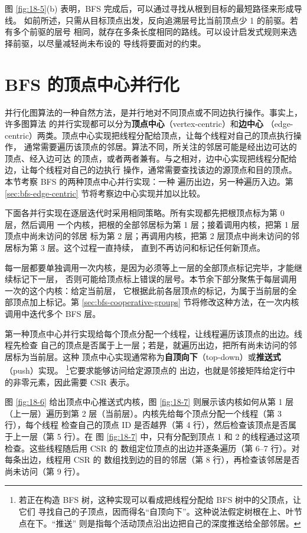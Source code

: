 图 \ref{fig:18-5}(b) 表明，BFS 完成后，可以通过寻找从根到目标的最短路径来形成导线。
如前所述，只需从目标顶点出发，反向追溯层号比当前顶点少 1 的前驱。若有多个前驱的层号
相同，就存在多条长度相同的路线。可以设计启发式规则来选择前驱，以尽量减轻尚未布设的
导线将要面对的约束。

\section{BFS 的顶点中心并行化}
\label{sec:bfs-vertex-centric}

并行化图算法的一种自然方法，是并行地对不同顶点或不同边执行操作。事实上，许多图算法
的并行实现都可以分为\textbf{顶点中心}（vertex-centric）和\textbf{边中心}
（edge-centric）两类。顶点中心实现把线程分配给顶点，让每个线程对自己的顶点执行操作，
通常需要遍历该顶点的邻居。算法不同，所关注的邻居可能是经出边可达的顶点、经入边可达
的顶点，或者两者兼有。与之相对，边中心实现把线程分配给边，让每个线程对自己的边执行
操作，通常需要查找该边的源顶点和目的顶点。本节考察 BFS 的两种顶点中心并行实现：一种
遍历出边，另一种遍历入边。第 \ref{sec:bfs-edge-centric} 节将考察边中心实现并加以比较。

下面各并行实现在逐层迭代时采用相同策略。所有实现都先把根顶点标为第 0 层，然后调用
一个内核，把根的全部邻居标为第 1 层；接着调用内核，把第 1 层顶点中尚未访问的邻居
标为第 2 层；再调用内核，把第 2 层顶点中尚未访问的邻居标为第 3 层。这个过程一直持续，
直到不再访问和标记任何新顶点。

每一层都要单独调用一次内核，是因为必须等上一层的全部顶点标记完毕，才能继续标记下一层，
否则可能给顶点标上错误的层号。本节余下部分聚焦于每层调用一次的这个内核：给定当前层，
它根据此前各层顶点的标记，为属于当前层的全部顶点加上标记。第
\ref{sec:bfs-cooperative-groups} 节将修改这种方法，在一次内核调用中迭代多个 BFS 层。

第一种顶点中心并行实现给每个顶点分配一个线程，让线程遍历该顶点的出边。线程先检查
自己的顶点是否属于上一层；若是，就遍历出边，把所有尚未访问的邻居标为当前层。这种
顶点中心实现通常称为\textbf{自顶向下}（top-down）或\textbf{推送式}（push）实现。
\footnote{若正在构造 BFS 树，这种实现可以看成把线程分配给 BFS 树中的父顶点，让它们
寻找自己的子顶点，因而得名“自顶向下”。这种说法假定树根在上、叶节点在下。“推送”
则是指每个活动顶点沿出边把自己的深度推送给全部邻居。}它要求能够访问给定源顶点的
出边，也就是邻接矩阵给定行中的非零元素，因此需要 CSR 表示。

图 \ref{fig:18-6} 给出顶点中心推送式内核，图 \ref{fig:18-7} 则展示该内核如何从第 1 层
（上一层）遍历到第 2 层（当前层）。内核先给每个顶点分配一个线程（第 3 行），每个线程
检查自己的顶点 ID 是否越界（第 4 行），然后检查该顶点是否属于上一层（第 5 行）。在
图 \ref{fig:18-7} 中，只有分配到顶点 1 和 2 的线程通过这项检查。这些线程随后用 CSR 的
 数组定位顶点的出边并逐条遍历（第 6--7 行）。对每条出边，线程用 CSR 的
 数组找到边的目的邻居（第 8 行），再检查该邻居是否尚未访问（第 9 行）。

